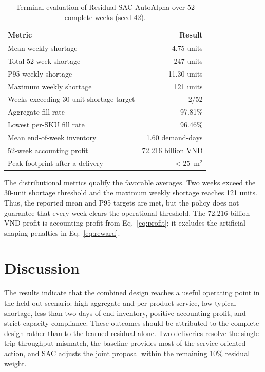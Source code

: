 \documentclass[pdflatex,sn-mathphys-num]{sn-jnl}
\begin{document}
\begin{table}[ht]
\centering
\caption{Terminal evaluation of Residual SAC-AutoAlpha over 52 complete weeks (seed 42).}
\label{tab:results}
\begin{tabular}{@{}lr@{}}
\toprule
Metric & Result \\
\midrule
Mean weekly shortage & 4.75 units \\
Total 52-week shortage & 247 units \\
P95 weekly shortage & 11.30 units \\
Maximum weekly shortage & 121 units \\
Weeks exceeding 30-unit shortage target & 2/52 \\
Aggregate fill rate & 97.81\% \\
Lowest per-SKU fill rate & 96.46\% \\
Mean end-of-week inventory & 1.60 demand-days \\
52-week accounting profit & 72.216 billion VND \\
Peak footprint after a delivery & $<25$~m$^2$ \\
\bottomrule
\end{tabular}
\end{table}

The distributional metrics qualify the favorable averages. Two weeks exceed the 30-unit shortage threshold and the maximum weekly shortage reaches 121 units. Thus, the reported mean and P95 targets are met, but the policy does not guarantee that every week clears the operational threshold. The 72.216 billion VND profit is accounting profit from Eq.~\eqref{eq:profit}; it excludes the artificial shaping penalties in Eq.~\eqref{eq:reward}.

\section{Discussion}\label{sec:discussion}

The results indicate that the combined design reaches a useful operating point in the held-out scenario: high aggregate and per-product service, low typical shortage, less than two days of end inventory, positive accounting profit, and strict capacity compliance. These outcomes should be attributed to the complete design rather than to the learned residual alone. Two deliveries resolve the single-trip throughput mismatch, the baseline provides most of the service-oriented action, and SAC adjusts the joint proposal within the remaining 10\% residual weight.
\end{document}
